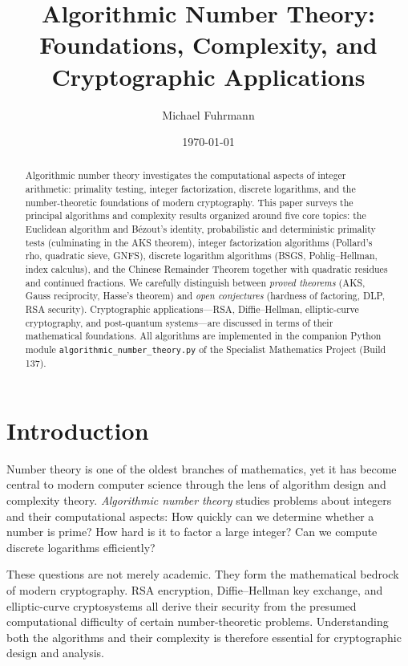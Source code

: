 \documentclass[12pt,a4paper]{amsart}
\author{Michael Fuhrmann}
\date{\today}
\title{Algorithmic Number Theory:\\
Foundations, Complexity, and Cryptographic Applications}
\theoremstyle{definition}
\begin{document}
\begin{abstract}
Algorithmic number theory investigates the computational aspects of integer
arithmetic: primality testing, integer factorization, discrete logarithms, and
the number-theoretic foundations of modern cryptography. This paper surveys
the principal algorithms and complexity results organized around five core
topics: the Euclidean algorithm and Bézout's identity, probabilistic and
deterministic primality tests (culminating in the AKS theorem), integer
factorization algorithms (Pollard's rho, quadratic sieve, GNFS), discrete
logarithm algorithms (BSGS, Pohlig--Hellman, index calculus), and the
Chinese Remainder Theorem together with quadratic residues and continued
fractions. We carefully distinguish between \emph{proved theorems} (AKS,
Gauss reciprocity, Hasse's theorem) and \emph{open conjectures} (hardness
of factoring, DLP, RSA security). Cryptographic applications---RSA, Diffie--Hellman,
elliptic-curve cryptography, and post-quantum systems---are discussed in
terms of their mathematical foundations. All algorithms are implemented in
the companion Python module \texttt{algorithmic\_number\_theory.py} of the
Specialist Mathematics Project (Build 137).
\end{abstract}

\maketitle
\tableofcontents

\section{Introduction}

Number theory is one of the oldest branches of mathematics, yet it has become
central to modern computer science through the lens of algorithm design and
complexity theory. \emph{Algorithmic number theory} studies problems about
integers and their computational aspects: How quickly can we determine whether
a number is prime? How hard is it to factor a large integer? Can we compute
discrete logarithms efficiently?

These questions are not merely academic. They form the mathematical bedrock of
modern cryptography. RSA encryption, Diffie--Hellman key exchange, and
elliptic-curve cryptosystems all derive their security from the presumed
computational difficulty of certain number-theoretic problems. Understanding
both the algorithms and their complexity is therefore essential for
cryptographic design and analysis.
\end{document}
